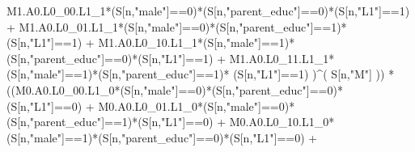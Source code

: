 \documentclass[
]{book}
\newenvironment{Shaded}{\begin{snugshade}}{\end{snugshade}}
\newcommand{\DecValTok}[1]{\textcolor[rgb]{0.00,0.00,0.81}{#1}}
\newcommand{\NormalTok}[1]{#1}
\newcommand{\SpecialCharTok}[1]{\textcolor[rgb]{0.00,0.00,0.00}{#1}}
\newcommand{\StringTok}[1]{\textcolor[rgb]{0.31,0.60,0.02}{#1}}
\begin{document}
\begin{Shaded}
\begin{Highlighting}[]
\NormalTok{          M1.A0.L0\_00.L1\_1}\SpecialCharTok{*}\NormalTok{(S[n,}\StringTok{"male"}\NormalTok{]}\SpecialCharTok{==}\DecValTok{0}\NormalTok{)}\SpecialCharTok{*}\NormalTok{(S[n,}\StringTok{"parent\_educ"}\NormalTok{]}\SpecialCharTok{==}\DecValTok{0}\NormalTok{)}\SpecialCharTok{*}\NormalTok{(S[n,}\StringTok{"L1"}\NormalTok{]}\SpecialCharTok{==}\DecValTok{1}\NormalTok{) }\SpecialCharTok{+}
\NormalTok{          M1.A0.L0\_01.L1\_1}\SpecialCharTok{*}\NormalTok{(S[n,}\StringTok{"male"}\NormalTok{]}\SpecialCharTok{==}\DecValTok{0}\NormalTok{)}\SpecialCharTok{*}\NormalTok{(S[n,}\StringTok{"parent\_educ"}\NormalTok{]}\SpecialCharTok{==}\DecValTok{1}\NormalTok{)}\SpecialCharTok{*}\NormalTok{(S[n,}\StringTok{"L1"}\NormalTok{]}\SpecialCharTok{==}\DecValTok{1}\NormalTok{) }\SpecialCharTok{+}
\NormalTok{          M1.A0.L0\_10.L1\_1}\SpecialCharTok{*}\NormalTok{(S[n,}\StringTok{"male"}\NormalTok{]}\SpecialCharTok{==}\DecValTok{1}\NormalTok{)}\SpecialCharTok{*}\NormalTok{(S[n,}\StringTok{"parent\_educ"}\NormalTok{]}\SpecialCharTok{==}\DecValTok{0}\NormalTok{)}\SpecialCharTok{*}\NormalTok{(S[n,}\StringTok{"L1"}\NormalTok{]}\SpecialCharTok{==}\DecValTok{1}\NormalTok{) }\SpecialCharTok{+}
\NormalTok{          M1.A0.L0\_11.L1\_1}\SpecialCharTok{*}\NormalTok{(S[n,}\StringTok{"male"}\NormalTok{]}\SpecialCharTok{==}\DecValTok{1}\NormalTok{)}\SpecialCharTok{*}\NormalTok{(S[n,}\StringTok{"parent\_educ"}\NormalTok{]}\SpecialCharTok{==}\DecValTok{1}\NormalTok{)}\SpecialCharTok{*}
\NormalTok{          (S[n,}\StringTok{"L1"}\NormalTok{]}\SpecialCharTok{==}\DecValTok{1}\NormalTok{) )}\SpecialCharTok{\^{}}\NormalTok{( S[n,}\StringTok{"M"}\NormalTok{] )) }\SpecialCharTok{*}
\NormalTok{      ((M0.A0.L0\_00.L1\_0}\SpecialCharTok{*}\NormalTok{(S[n,}\StringTok{"male"}\NormalTok{]}\SpecialCharTok{==}\DecValTok{0}\NormalTok{)}\SpecialCharTok{*}\NormalTok{(S[n,}\StringTok{"parent\_educ"}\NormalTok{]}\SpecialCharTok{==}\DecValTok{0}\NormalTok{)}\SpecialCharTok{*}\NormalTok{(S[n,}\StringTok{"L1"}\NormalTok{]}\SpecialCharTok{==}\DecValTok{0}\NormalTok{) }\SpecialCharTok{+}               
\NormalTok{          M0.A0.L0\_01.L1\_0}\SpecialCharTok{*}\NormalTok{(S[n,}\StringTok{"male"}\NormalTok{]}\SpecialCharTok{==}\DecValTok{0}\NormalTok{)}\SpecialCharTok{*}\NormalTok{(S[n,}\StringTok{"parent\_educ"}\NormalTok{]}\SpecialCharTok{==}\DecValTok{1}\NormalTok{)}\SpecialCharTok{*}\NormalTok{(S[n,}\StringTok{"L1"}\NormalTok{]}\SpecialCharTok{==}\DecValTok{0}\NormalTok{) }\SpecialCharTok{+}
\NormalTok{          M0.A0.L0\_10.L1\_0}\SpecialCharTok{*}\NormalTok{(S[n,}\StringTok{"male"}\NormalTok{]}\SpecialCharTok{==}\DecValTok{1}\NormalTok{)}\SpecialCharTok{*}\NormalTok{(S[n,}\StringTok{"parent\_educ"}\NormalTok{]}\SpecialCharTok{==}\DecValTok{0}\NormalTok{)}\SpecialCharTok{*}\NormalTok{(S[n,}\StringTok{"L1"}\NormalTok{]}\SpecialCharTok{==}\DecValTok{0}\NormalTok{) }\SpecialCharTok{+} 

\end{Highlighting}
\end{Shaded}
\end{document}

